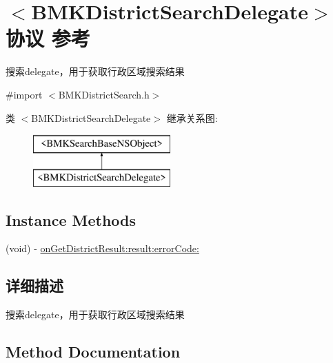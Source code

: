 \hypertarget{protocol_b_m_k_district_search_delegate-p}{}\section{$<$B\+M\+K\+District\+Search\+Delegate$>$协议 参考}
\label{protocol_b_m_k_district_search_delegate-p}


搜索delegate，用于获取行政区域搜索结果  




{\ttfamily \#import $<$B\+M\+K\+District\+Search.\+h$>$}

类 $<$B\+M\+K\+District\+Search\+Delegate$>$ 继承关系图\+:\begin{figure}[H]
\begin{center}
\leavevmode
\includegraphics[height=2.000000cm]{protocol_b_m_k_district_search_delegate-p}
\end{center}
\end{figure}
\subsection*{Instance Methods}
\begin{DoxyCompactItemize}
\item 
(void) -\/ \hyperlink{protocol_b_m_k_district_search_delegate-p_a4f2dd5710954d1456ec8f38b1cfe0a0d}{on\+Get\+District\+Result\+:result\+:error\+Code\+:}
\end{DoxyCompactItemize}


\subsection{详细描述}
搜索delegate，用于获取行政区域搜索结果 

\subsection{Method Documentation}
\hypertarget{protocol_b_m_k_district_search_delegate-p_a4f2dd5710954d1456ec8f38b1cfe0a0d}{}
